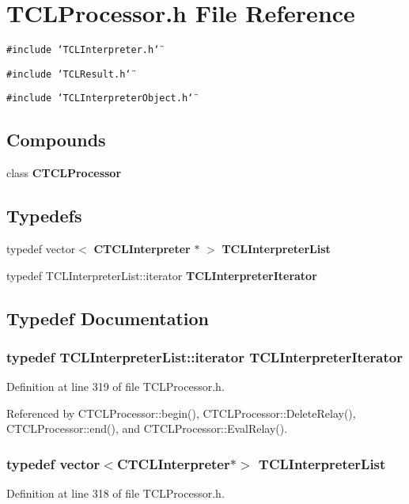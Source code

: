 \section{TCLProcessor.h File Reference}
\label{TCLProcessor_8h}
{\tt \#include \char`\"{}TCLInterpreter.h\char`\"{}}\par
{\tt \#include \char`\"{}TCLResult.h\char`\"{}}\par
{\tt \#include \char`\"{}TCLInterpreter\-Object.h\char`\"{}}\par
\subsection*{Compounds}
\begin{CompactItemize}
\item 
class {\bf CTCLProcessor}
\end{CompactItemize}
\subsection*{Typedefs}
\begin{CompactItemize}
\item 
typedef vector$<$ {\bf CTCLInterpreter} $\ast$ $>$ {\bf TCLInterpreter\-List}
\item 
typedef TCLInterpreter\-List::iterator {\bf TCLInterpreter\-Iterator}
\end{CompactItemize}


\subsection{Typedef Documentation}
\subsubsection{\setlength{\rightskip}{0pt plus 5cm}typedef TCLInterpreter\-List::iterator TCLInterpreter\-Iterator}\label{TCLProcessor_8h_a1}




Definition at line 319 of file TCLProcessor.h.

Referenced by CTCLProcessor::begin(), CTCLProcessor::Delete\-Relay(), CTCLProcessor::end(), and CTCLProcessor::Eval\-Relay().
\subsubsection{\setlength{\rightskip}{0pt plus 5cm}typedef vector$<${\bf CTCLInterpreter}$\ast$$>$ TCLInterpreter\-List}\label{TCLProcessor_8h_a0}




Definition at line 318 of file TCLProcessor.h.